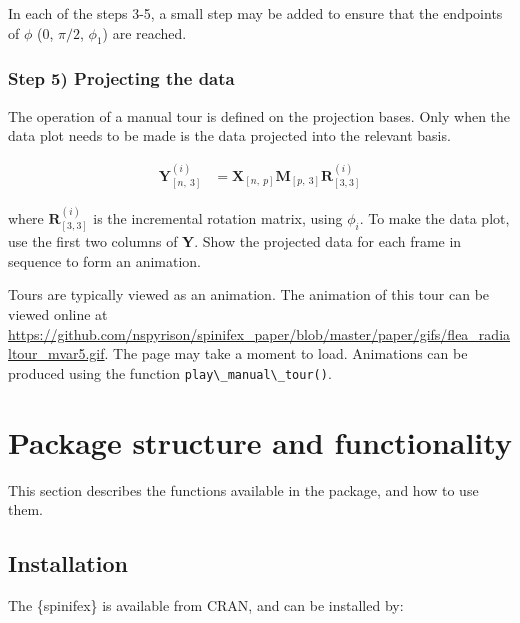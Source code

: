 \documentclass{monashthesis}
\begin{document}
In each of the steps 3-5, a small step may be added to ensure that the endpoints of \(\phi\) (\(0\), \(\pi/2\), \(\phi_1\)) are reached.

\hypertarget{sec:display}{%
\subsubsection{Step 5) Projecting the data}\label{sec:display}}

The operation of a manual tour is defined on the projection bases. Only when the data plot needs to be made is the data projected into the relevant basis.

\begin{align*}
  \textbf{Y}^{(i)}_{[n,~3]} &= \textbf{X}_{[n,~p]} \textbf{M}_{[p,~3]} \textbf{R}^{(i)}_{[3,3]}
\end{align*}

\noindent where \(\textbf{R}^{(i)}_{[3,3]}\) is the incremental rotation matrix, using \(\phi_i\). To make the data plot, use the first two columns of \textbf{Y}. Show the projected data for each frame in sequence to form an animation.

Tours are typically viewed as an animation. The animation of this tour can be viewed online at \url{https://github.com/nspyrison/spinifex_paper/blob/master/paper/gifs/flea_radialtour_mvar5.gif}. The page may take a moment to load. Animations can be produced using the function \texttt{play\textbackslash{}\_manual\textbackslash{}\_tour()}.

\hypertarget{package-structure-and-functionality}{%
\section{Package structure and functionality}\label{package-structure-and-functionality}}

This section describes the functions available in the package, and how to use them.

\hypertarget{installation}{%
\subsection{Installation}\label{installation}}

The \{spinifex\} is available from CRAN, and can be installed by:

\begin{Shaded}
\begin{Highlighting}[]
\NormalTok{(}\NormalTok{) }
\NormalTok{(}\NormalTok{) }

\NormalTok{(}\NormalTok{)}
\NormalTok{(}\NormalTok{)}
\end{Highlighting}
\end{Shaded}
\end{document}
